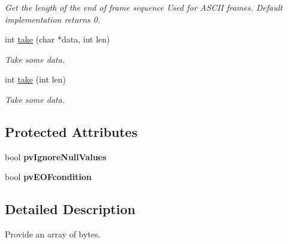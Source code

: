 \begin{DoxyCompactItemize}
\begin{DoxyCompactList}\small\item\em Get the length of the end of frame sequence Used for ASCII frames. Default implementation returns 0. \end{DoxyCompactList}\item 
int \hyperlink{classmdt_frame_a36e4b85a3c671902ac3c8cc318ca726c}{take} (char $\ast$data, int len)
\begin{DoxyCompactList}\small\item\em Take some data. \end{DoxyCompactList}\item 
int \hyperlink{classmdt_frame_ad8b184e6eb07a26fe84deaf233c1aa9b}{take} (int len)
\begin{DoxyCompactList}\small\item\em Take some data. \end{DoxyCompactList}\end{DoxyCompactItemize}
\subsection*{Protected Attributes}
\begin{DoxyCompactItemize}
\item 
\hypertarget{classmdt_frame_a883c4de8f2c961310366d5a72b6e6dd8}{
bool {\bfseries pvIgnoreNullValues}}
\label{classmdt_frame_a883c4de8f2c961310366d5a72b6e6dd8}

\item 
\hypertarget{classmdt_frame_a1862e197bad6e9887cfedc54a768e88d}{
bool {\bfseries pvEOFcondition}}
\label{classmdt_frame_a1862e197bad6e9887cfedc54a768e88d}

\end{DoxyCompactItemize}


\subsection{Detailed Description}
Provide an array of bytes. 

